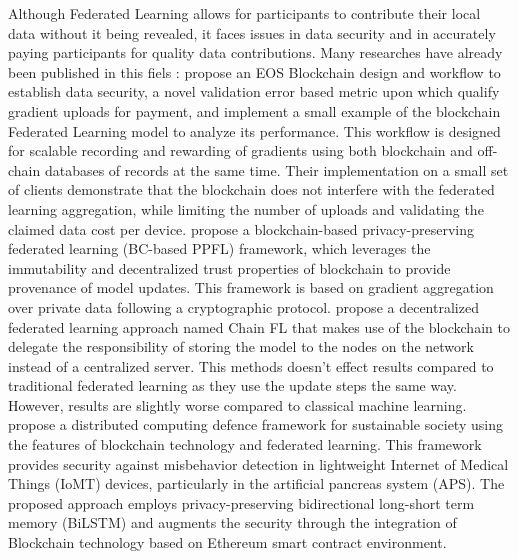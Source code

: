 \documentclass{article}
\begin{document}
Although Federated Learning allows for participants to contribute their local data without it being revealed, it faces issues in data security and in accurately paying participants for quality data contributions. Many researches have already been published in this fiels : 
\newline \newline \cite{martinez_record_2019} propose an EOS Blockchain design and workflow to establish data security, a novel validation error based metric upon which \cite{martinez_record_2019} qualify gradient uploads for payment, and implement a small example of the blockchain Federated Learning model to analyze its performance. This workflow is designed for scalable recording and rewarding of gradients using both blockchain and off-chain databases of records at the same time. Their implementation on a small set of clients demonstrate that the blockchain does not interfere with the federated learning aggregation, while limiting the number of uploads and validating the claimed data cost per device. 
\newline \newline \cite{awan_poster_2019} propose a blockchain-based privacy-preserving federated learning (BC-based PPFL) framework, which leverages the immutability and decentralized trust properties of blockchain to provide provenance of model updates. This framework is based on gradient aggregation over private data following a cryptographic protocol.
\newline \newline \cite{korkmaz_chainfl_2020} propose a decentralized federated learning approach named Chain FL that makes use of the blockchain to delegate the responsibility of storing the model to the nodes on the network instead of a centralized server. This methods doesn’t effect results compared to traditional federated learning as they use the update steps the same way. However, results are slightly worse compared to classical machine learning.
\newline \newline \cite{sharma_2020} propose a distributed computing defence framework for sustainable society using the features of blockchain technology and federated learning. This framework provides security against misbehavior detection in lightweight Internet of Medical Things (IoMT) devices, particularly in the artificial pancreas system (APS). The proposed approach employs privacy-preserving bidirectional long-short term memory (BiLSTM) and augments the security through the integration of Blockchain technology based on Ethereum smart contract environment.
\end{document}
